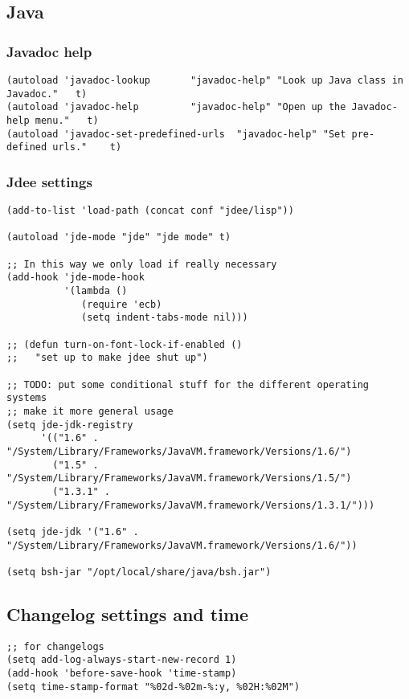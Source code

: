 \documentclass[11pt]{article}
\begin{document}
\subsection{Java}
\label{sec-31.9}
\subsubsection{Javadoc help}
\label{sec-31.9.1}

\begin{verbatim}
(autoload 'javadoc-lookup       "javadoc-help" "Look up Java class in Javadoc."   t)
(autoload 'javadoc-help         "javadoc-help" "Open up the Javadoc-help menu."   t)
(autoload 'javadoc-set-predefined-urls  "javadoc-help" "Set pre-defined urls."    t)
\end{verbatim}

  
\subsubsection{Jdee settings}
\label{sec-31.9.2}

\begin{verbatim}
(add-to-list 'load-path (concat conf "jdee/lisp"))

(autoload 'jde-mode "jde" "jde mode" t)

;; In this way we only load if really necessary
(add-hook 'jde-mode-hook
          '(lambda ()
             (require 'ecb)
             (setq indent-tabs-mode nil)))

;; (defun turn-on-font-lock-if-enabled ()
;;   "set up to make jdee shut up")

;; TODO: put some conditional stuff for the different operating systems
;; make it more general usage
(setq jde-jdk-registry
      '(("1.6" . "/System/Library/Frameworks/JavaVM.framework/Versions/1.6/")
        ("1.5" . "/System/Library/Frameworks/JavaVM.framework/Versions/1.5/")
        ("1.3.1" . "/System/Library/Frameworks/JavaVM.framework/Versions/1.3.1/")))

(setq jde-jdk '("1.6" . "/System/Library/Frameworks/JavaVM.framework/Versions/1.6/"))

(setq bsh-jar "/opt/local/share/java/bsh.jar")
\end{verbatim}
\subsection{Changelog settings and time}
\label{sec-31.10}

\begin{verbatim}
;; for changelogs
(setq add-log-always-start-new-record 1)
(add-hook 'before-save-hook 'time-stamp)
(setq time-stamp-format "%02d-%02m-%:y, %02H:%02M")
\end{verbatim}
\end{document}
